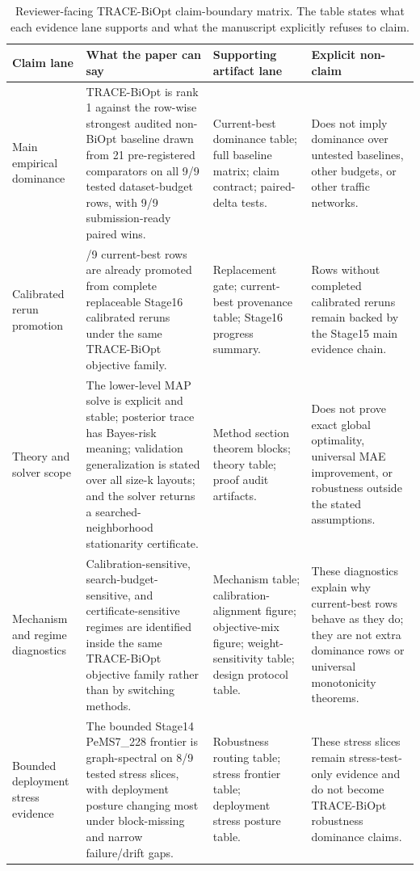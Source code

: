 \begin{table}[pos=htbp]
\centering
\caption{Reviewer-facing TRACE-BiOpt claim-boundary matrix. The table states what each evidence lane supports and what the manuscript explicitly refuses to claim.}
\label{tab:trace-biopt-claim-boundary-matrix}
\scriptsize
\begin{tabularx}{\textwidth}{>{\raggedright\arraybackslash}p{}>{\raggedright\arraybackslash}p{}>{\raggedright\arraybackslash}p{}>{\raggedright\arraybackslash}X}
\toprule
Claim lane & What the paper can say & Supporting artifact lane & Explicit non-claim \\
\midrule
Main empirical dominance & TRACE-BiOpt is rank 1 against the row-wise strongest audited non-BiOpt baseline drawn from 21 pre-registered comparators on all 9/9 tested dataset-budget rows, with 9/9 submission-ready paired wins. & Current-best dominance table; full baseline matrix; claim contract; paired-delta tests. & Does not imply dominance over untested baselines, other budgets, or other traffic networks. \\
Calibrated rerun promotion & 8/9 current-best rows are already promoted from complete replaceable Stage16 calibrated reruns under the same TRACE-BiOpt objective family. & Replacement gate; current-best provenance table; Stage16 progress summary. & Rows without completed calibrated reruns remain backed by the Stage15 main evidence chain. \\
Theory and solver scope & The lower-level MAP solve is explicit and stable; posterior trace has Bayes-risk meaning; validation generalization is stated over all size-k layouts; and the solver returns a searched-neighborhood stationarity certificate. & Method section theorem blocks; theory table; proof audit artifacts. & Does not prove exact global optimality, universal MAE improvement, or robustness outside the stated assumptions. \\
Mechanism and regime diagnostics & Calibration-sensitive, search-budget-sensitive, and certificate-sensitive regimes are identified inside the same TRACE-BiOpt objective family rather than by switching methods. & Mechanism table; calibration-alignment figure; objective-mix figure; weight-sensitivity table; design protocol table. & These diagnostics explain why current-best rows behave as they do; they are not extra dominance rows or universal monotonicity theorems. \\
Bounded deployment stress evidence & The bounded Stage14 PeMS7\_228 frontier is graph-spectral on 8/9 tested stress slices, with deployment posture changing most under block-missing and narrow failure/drift gaps. & Robustness routing table; stress frontier table; deployment stress posture table. & These stress slices remain stress-test-only evidence and do not become TRACE-BiOpt robustness dominance claims. \\
\bottomrule
\end{tabularx}
\end{table}
